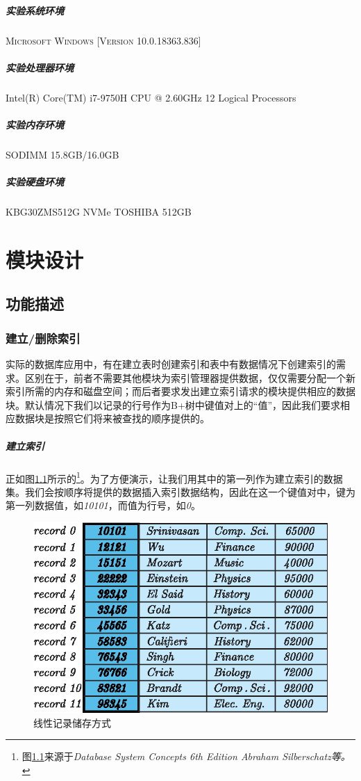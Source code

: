 \documentclass[UTF8]{ctexrep} %
\begin{document}
\paragraph{实验系统环境} \textsc{Microsoft Windows [Version 10.0.18363.836]}
\paragraph{实验处理器环境} Intel(R) Core(TM) i7-9750H CPU @ 2.60GHz 12 Logical Processors
\paragraph{实验内存环境} SODIMM 15.8GB/16.0GB
\paragraph{实验硬盘环境} KBG30ZMS512G NVMe TOSHIBA 512GB


\chapter{模块设计}
\section{功能描述}
\subsection{建立/删除索引}
实际的数据库应用中，有在建立表时创建索引和表中有数据情况下创建索引的需求。区别在于，前者不需要其他模块为索引管理器提供数据，仅仅需要分配一个新索引所需的内存和磁盘空间；而后者要求发出建立索引请求的模块提供相应的数据块。默认情况下我们以记录的行号作为B+树中键值对上的“值”，因此我们要求相应数据块是按照它们将来被查找的顺序提供的。
\paragraph{建立索引}
正如图\ref{fig:index_example}所示的\footnote{图\ref{fig:index_example}来源于\textit{Database System Concepts 6th Edition Abraham Silberschatz等。}}。为了方便演示，让我们用其中的第一列作为建立索引的数据集。我们会按顺序将提供的数据插入索引数据结构，因此在这一个键值对中，键为第一列数据值，如\textit{10101}，而值为行号，如\textit{0}。
\begin{figure}[H]
    \centering
    \includegraphics[width=0.7\linewidth]{figure/index_example.eps}
    \caption{线性记录储存方式}
    \label{fig:index_example}
\end{figure}
\end{document}
